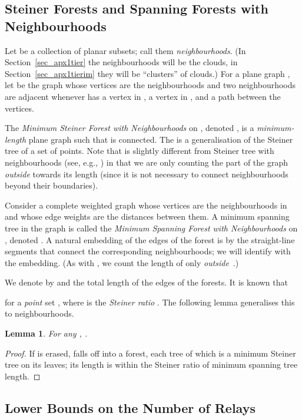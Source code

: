 \documentclass[11pt,a4paper]{article}
\newtheorem{lemma}{Lemma}
\theoremstyle{definition}
\theoremstyle{remark}
\begin{document}
\subsection{Steiner Forests and Spanning Forests with Neighbourhoods}

Let  be a collection of planar subsets; call them \emph{neighbourhoods}. (In Section~\ref{sec_apx1tier} the neighbourhoods will be the clouds, in Section~\ref{sec_apx1tierim} they will be ``clusters'' of clouds.)  For a plane graph , let  be the graph whose vertices are the neighbourhoods and two neighbourhoods  are adjacent whenever  has a vertex in , a vertex in , and a path between the vertices.

The \emph{Minimum Steiner Forest with Neighbourhoods} on , denoted , is a \emph{minimum-length} plane graph  such that  is connected. The  is a generalisation of the Steiner tree of a set of points. Note that  is slightly different from Steiner tree with neighbourhoods (see, e.g., \citet{yang07minimum}) in that we are only counting the part of the graph \emph{outside}  towards its length (since it is not necessary to connect neighbourhoods beyond their boundaries).

Consider a complete weighted graph whose vertices are the neighbourhoods in  and whose edge weights are the distances between them.  A minimum spanning tree in the graph is called the \emph{Minimum Spanning Forest with Neighbourhoods} on , denoted .  A natural embedding of the edges of the forest is by the straight-line segments that connect the corresponding neighbourhoods; we will identify  with the embedding.  (As with , we count the length of  only \emph{outside}~.)

We denote by  and  the total length of the edges of the forests.  It is known that

for a \emph{point} set , where  is the \emph{Steiner ratio} \cite{du90approach}. The following lemma generalises this to neighbourhoods.
\begin{lemma}\label{lem_StRatio}
    For any\/ , .
\end{lemma}
\begin{proof}
    If  is erased,  falls off into a forest, each tree of which is a minimum Steiner tree on its leaves; its length is within the Steiner ratio of minimum spanning tree length.
\end{proof}

\subsection{Lower Bounds on the Number of Relays}\label{ssec:lower-bounds}
\end{document}
